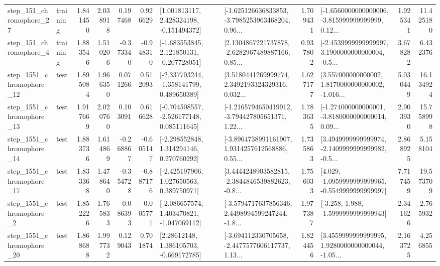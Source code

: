 \begin{tabular}{llrrrrllrlrr}
  step\_151\_chromophore\_27 &  training &      1.841450 &    2.038918 &      0.197468 &  0.926629 &    [1.001813117, 2.428324198, -0.151494372] &  [-1.625126636833853, -3.7985253963468204, 0.96... &       1.709431 &  [-1.6560000000000006, -3.815999999999999, 0.12... &            1.925341 &         11.425180 \\
   step\_151\_chromophore\_4 &  training &      1.883546 &    1.510206 &     -0.373340 & -0.948310 &   [-1.683553845, 2.121850131, -0.207728051] &  [2.1304867221737878, -2.6282967489887166, 0.85... &       0.937802 &  [-2.4539999999999997, 3.1900000000000004, -0.5... &            3.678282 &          6.432376 \\
 step\_1551\_chromophore\_12 &      test &      1.895084 &    1.966350 &      0.071266 &  0.512093 &   [-2.337703244, -1.358141799, 0.489650389] &  [3.5180441269999774, 2.3492193324329316, 0.032... &       1.627177 &  [3.557000000000002, 1.8170000000000002, -1.016... &            5.030449 &         16.134924 \\
 step\_1551\_chromophore\_13 &      test &      1.917669 &    2.020760 &      0.103091 &  0.616628 &   [-0.704508557, -2.526177148, 0.085111645] &  [-1.2165794650419912, -3.794427805651371, 1.22... &       1.783635 &  [-1.274000000000001, -3.8180000000000014, 0.09... &            2.903930 &         15.758998 \\
 step\_1551\_chromophore\_14 &      test &      1.883736 &    1.614869 &     -0.268867 & -0.605147 &    [-2.298552848, 1.314294146, 0.270760292] &  [-3.8964738991161907, 1.9314257612568886, 0.55... &       1.735863 &  [3.4949999999999974, -2.1409999999999982, -0.5... &            2.868925 &          5.158104 \\
 step\_1551\_chromophore\_17 &      test &      1.833368 &    1.478640 &     -0.354728 & -0.887176 &    [-2.425197906, 1.027650563, 0.389750971] &  [3.4444248903582815, -2.3844846539882623, -0.8... &       1.756033 &  [4.029, -1.0959999999999965, -0.5549999999999997] &            7.717459 &         19.573709 \\
  step\_1551\_chromophore\_2 &      test &      1.852226 &    1.765833 &     -0.086393 & -0.005771 &   [-2.086657574, 1.403470821, -1.047069112] &  [-3.5794717637856346, 2.4498994599247244, -1.8... &       1.977387 &               [-3.258, 1.988, -1.5999999999999943] &            2.341626 &          2.765932 \\
 step\_1551\_chromophore\_20 &      test &      1.868688 &    1.997732 &      0.129043 &  0.701874 &     [2.28612148, 1.386105703, -0.669172785] &  [-3.694112330705658, -2.4477577606117737, 1.13... &       1.824456 &  [3.4559999999999995, 1.9280000000000044, -1.05... &            2.163725 &          4.256855 \\

\end{tabular}
